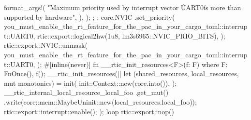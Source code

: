 {{{{{                        format_args!(
                            "Maximum priority used by interrupt vector \'UART0\' is more than supported by hardware",
                        ),
                    );
                };
            };
            core.NVIC
                .set_priority(
                    you_must_enable_the_rt_feature_for_the_pac_in_your_cargo_toml::interrupt::UART0,
                    rtic::export::logical2hw(1u8, lm3s6965::NVIC_PRIO_BITS),
                );
            rtic::export::NVIC::unmask(
                you_must_enable_the_rt_feature_for_the_pac_in_your_cargo_toml::interrupt::UART0,
            );
            #[inline(never)]
            fn __rtic_init_resources<F>(f: F)
            where
                F: FnOnce(),
            {
                f();
            }
            __rtic_init_resources(|| {
                let (shared_resources, local_resources, mut monotonics) = init(
                    init::Context::new(core.into()),
                );
                __rtic_internal_local_resource_local_foo
                    .get_mut()
                    .write(core::mem::MaybeUninit::new(local_resources.local_foo));
                rtic::export::interrupt::enable();
            });
            loop {
                rtic::export::nop()
            }
        }
    }
}
